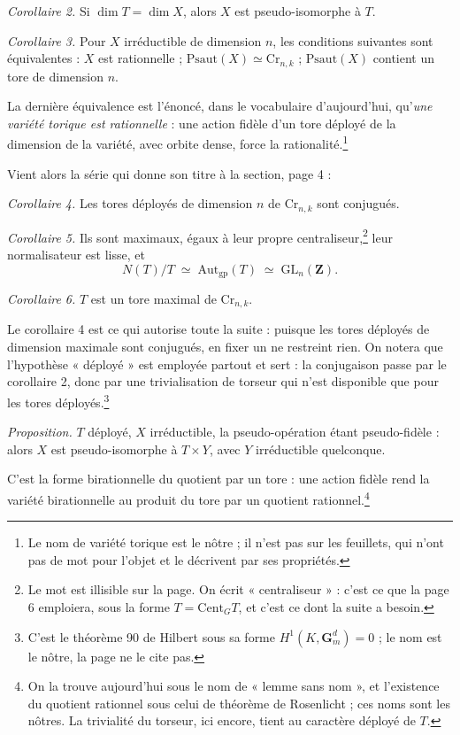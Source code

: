 \documentclass[11pt,a4paper]{article}
\begin{document}
\emph{Corollaire 2.} Si $\dim T = \dim X$, alors $X$ est pseudo-isomorphe à
$T$.

\emph{Corollaire 3.} Pour $X$ irréductible de dimension $n$, les conditions
suivantes sont équivalentes : $X$ est rationnelle ; $\mathrm{Psaut}(X) \simeq
\mathrm{Cr}_{n,k}$ ; $\mathrm{Psaut}(X)$ contient un tore de dimension $n$.

La dernière équivalence est l'énoncé, dans le vocabulaire
d'aujourd'hui, qu'\emph{une variété torique est rationnelle} : une action
fidèle d'un tore déployé de la dimension de la variété, avec orbite dense,
force la rationalité.\footnote{Le nom de variété torique est le nôtre ; il
n'est pas sur les feuillets, qui n'ont pas de mot pour l'objet et le décrivent
par ses propriétés.}

Vient alors la série qui donne son titre à la section, page 4 :

\emph{Corollaire 4.} Les tores déployés de dimension $n$ de $\mathrm{Cr}_{n,k}$
sont conjugués.

\emph{Corollaire 5.} Ils sont maximaux, égaux à leur propre
centraliseur,\footnote{Le mot est illisible sur la page. On écrit
« centraliseur » : c'est ce que la page 6 emploiera, sous la forme $T =
\mathrm{Cent}_G T$, et c'est ce dont la suite a besoin.} leur normalisateur est
lisse, et
\[
  N(T)/T \;\simeq\; \mathrm{Aut}_{\mathrm{gp}}(T) \;\simeq\;
  \mathrm{GL}_n(\mathbf{Z}).
\]

\emph{Corollaire 6.} $T$ est un tore maximal de $\mathrm{Cr}_{n,k}$.

Le corollaire 4 est ce qui autorise toute la suite : puisque les tores déployés
de dimension maximale sont conjugués, en fixer un ne restreint rien. On notera
que l'hypothèse « déployé » est employée partout et sert : la
conjugaison passe par le corollaire 2, donc par une trivialisation de torseur
qui n'est disponible que pour les tores déployés.\footnote{C'est le théorème 90
de Hilbert sous sa forme $H^1(K, \mathbf{G}_m^d) = 0$ ; le nom est le nôtre, la
page ne le cite pas.}

\emph{Proposition.} $T$ déployé, $X$ irréductible, la pseudo-opération étant
pseudo-fidèle : alors $X$ est pseudo-isomorphe à $T \times Y$, avec $Y$
irréductible quelconque.

C'est la forme birationnelle du quotient par un tore : une action fidèle rend
la variété birationnelle au produit du tore par un quotient
rationnel.\footnote{On la trouve aujourd'hui sous le nom de « lemme sans nom »,
et l'existence du quotient rationnel sous celui de théorème de Rosenlicht ; ces
noms sont les nôtres. La trivialité du torseur, ici encore, tient au caractère
déployé de $T$.}
\end{document}
